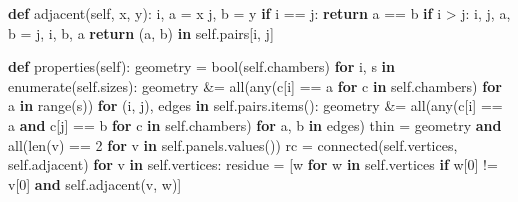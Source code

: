 \documentclass[
  10pt,
  letterpaper,
]{article}
\newenvironment{Shaded}{}{}
\newcommand{\BuiltInTok}[1]{\textcolor[rgb]{0.00,0.50,0.00}{#1}}
\newcommand{\ControlFlowTok}[1]{\textcolor[rgb]{0.00,0.44,0.13}{\textbf{#1}}}
\newcommand{\DecValTok}[1]{\textcolor[rgb]{0.25,0.63,0.44}{#1}}
\newcommand{\KeywordTok}[1]{\textcolor[rgb]{0.00,0.44,0.13}{\textbf{#1}}}
\newcommand{\NormalTok}[1]{#1}
\newcommand{\OperatorTok}[1]{\textcolor[rgb]{0.40,0.40,0.40}{#1}}
\newcommand{\VariableTok}[1]{\textcolor[rgb]{0.10,0.09,0.49}{#1}}
\begin{document}
\begin{Shaded}
\begin{Highlighting}[]
    \KeywordTok{def}\NormalTok{ adjacent(}\VariableTok{self}\NormalTok{, x, y):}
\NormalTok{        i, a }\OperatorTok{=}\NormalTok{ x}
\NormalTok{        j, b }\OperatorTok{=}\NormalTok{ y}
        \ControlFlowTok{if}\NormalTok{ i }\OperatorTok{==}\NormalTok{ j:}
            \ControlFlowTok{return}\NormalTok{ a }\OperatorTok{==}\NormalTok{ b}
        \ControlFlowTok{if}\NormalTok{ i }\OperatorTok{\textgreater{}}\NormalTok{ j:}
\NormalTok{            i, j, a, b }\OperatorTok{=}\NormalTok{ j, i, b, a}
        \ControlFlowTok{return}\NormalTok{ (a, b) }\KeywordTok{in} \VariableTok{self}\NormalTok{.pairs[i, j]}

    \KeywordTok{def}\NormalTok{ properties(}\VariableTok{self}\NormalTok{):}
\NormalTok{        geometry }\OperatorTok{=} \BuiltInTok{bool}\NormalTok{(}\VariableTok{self}\NormalTok{.chambers)}
        \ControlFlowTok{for}\NormalTok{ i, s }\KeywordTok{in} \BuiltInTok{enumerate}\NormalTok{(}\VariableTok{self}\NormalTok{.sizes):}
\NormalTok{            geometry }\OperatorTok{\&=} \BuiltInTok{all}\NormalTok{(}\BuiltInTok{any}\NormalTok{(c[i] }\OperatorTok{==}\NormalTok{ a }\ControlFlowTok{for}\NormalTok{ c }\KeywordTok{in} \VariableTok{self}\NormalTok{.chambers) }\ControlFlowTok{for}\NormalTok{ a }\KeywordTok{in} \BuiltInTok{range}\NormalTok{(s))}
        \ControlFlowTok{for}\NormalTok{ (i, j), edges }\KeywordTok{in} \VariableTok{self}\NormalTok{.pairs.items():}
\NormalTok{            geometry }\OperatorTok{\&=} \BuiltInTok{all}\NormalTok{(}\BuiltInTok{any}\NormalTok{(c[i] }\OperatorTok{==}\NormalTok{ a }\KeywordTok{and}\NormalTok{ c[j] }\OperatorTok{==}\NormalTok{ b }\ControlFlowTok{for}\NormalTok{ c }\KeywordTok{in} \VariableTok{self}\NormalTok{.chambers)}
                            \ControlFlowTok{for}\NormalTok{ a, b }\KeywordTok{in}\NormalTok{ edges)}
\NormalTok{        thin }\OperatorTok{=}\NormalTok{ geometry }\KeywordTok{and} \BuiltInTok{all}\NormalTok{(}\BuiltInTok{len}\NormalTok{(v) }\OperatorTok{==} \DecValTok{2} \ControlFlowTok{for}\NormalTok{ v }\KeywordTok{in} \VariableTok{self}\NormalTok{.panels.values())}
\NormalTok{        rc }\OperatorTok{=}\NormalTok{ connected(}\VariableTok{self}\NormalTok{.vertices, }\VariableTok{self}\NormalTok{.adjacent)}
        \ControlFlowTok{for}\NormalTok{ v }\KeywordTok{in} \VariableTok{self}\NormalTok{.vertices:}
\NormalTok{            residue }\OperatorTok{=}\NormalTok{ [w }\ControlFlowTok{for}\NormalTok{ w }\KeywordTok{in} \VariableTok{self}\NormalTok{.vertices }\ControlFlowTok{if}\NormalTok{ w[}\DecValTok{0}\NormalTok{] }\OperatorTok{!=}\NormalTok{ v[}\DecValTok{0}\NormalTok{] }\KeywordTok{and} \VariableTok{self}\NormalTok{.adjacent(v, w)]}

\end{Highlighting}
\end{Shaded}
\end{document}
